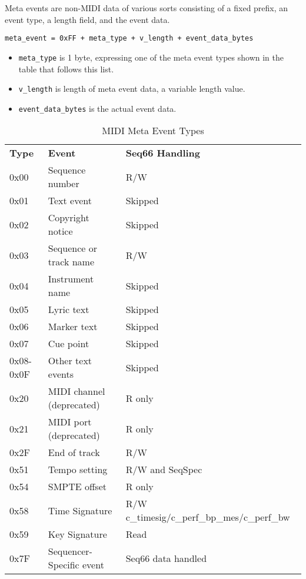    Meta events are non-MIDI data of various sorts consisting of a fixed prefix,
   an event type, a length field, and the event data.
 
   \texttt{meta\_event = 0xFF + meta\_type + v\_length + event\_data\_bytes}

   \begin{itemize}
      \item \texttt{meta\_type} is 1 byte, expressing one of the meta event
         types shown in the table that follows this list.
      \item \texttt{v\_length} is length of meta event data, a variable
         length value.
      \item \texttt{event\_data\_bytes} is the actual event data.
   \end{itemize}

   \begin{table}
      \centering
      \caption{MIDI Meta Event Types}
      \label{table:midi_meta_event_types}
      \begin{tabular}{l l l}
         \textbf{Type} & \textbf{Event} & \textbf{Seq66 Handling}\\
         0x00 & Sequence number                 & R/W \\
         0x01 & Text event                      & Skipped \\
         0x02 & Copyright notice                & Skipped \\
         0x03 & Sequence or track name          & R/W \\
         0x04 & Instrument name                 & Skipped \\
         0x05 & Lyric text                      & Skipped \\
         0x06 & Marker text                     & Skipped \\
         0x07 & Cue point                       & Skipped \\
         0x08-0x0F & Other text events          & Skipped \\
         0x20 & MIDI channel (deprecated)       & R only \\
         0x21 & MIDI port (deprecated)          & R only \\
         0x2F & End of track                    & R/W \\
         0x51 & Tempo setting                   & R/W and SeqSpec \\
         0x54 & SMPTE offset                    & R only \\
         0x58 & Time Signature & R/W c\_timesig/c\_perf\_bp\_mes/c\_perf\_bw \\
         0x59 & Key Signature                   & Read \\
         0x7F & Sequencer-Specific event        & Seq66 data handled \\
      \end{tabular}
   \end{table}

